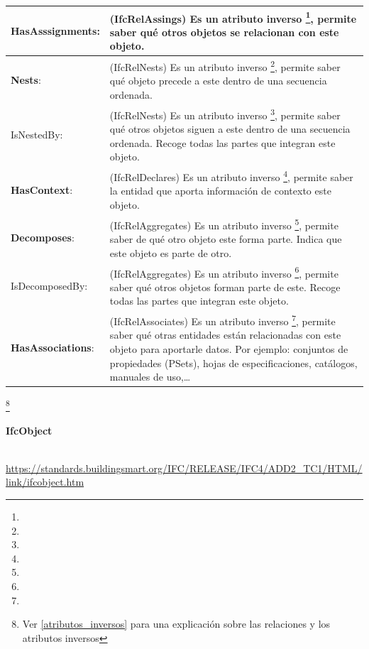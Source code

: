 \documentclass[spanish,12pt,a4paper,final,oneside]{book}
\begin{document}
\begin{longtable}{|p{2.5cm} p{11cm}|}
\hline

\textbf{HasAsssignments}: & (IfcRelAssings) Es un atributo inverso \footnote{}, permite saber qué otros objetos se relacionan con este objeto.
\\[0.1cm] \hline

\textbf{Nests}: & (IfcRelNests) Es un atributo inverso \footnote{}, permite saber qué objeto precede a este dentro de una secuencia ordenada.
\\[0.1cm] \hline

IsNestedBy: & (IfcRelNests) Es un atributo inverso \footnote{}, permite saber qué otros objetos siguen a este dentro de una secuencia ordenada. Recoge todas las partes que integran este objeto.
\\[0.1cm] \hline

\textbf{HasContext}: & (IfcRelDeclares) Es un atributo inverso \footnote{}, permite saber la entidad que aporta información de contexto este objeto.
\\[0.1cm] \hline

\textbf{Decomposes}: & (IfcRelAggregates) Es un atributo inverso \footnote{}, permite saber de qué otro objeto este forma parte. Indica que este objeto es parte de otro.
\\[0.1cm] \hline

IsDecomposedBy: & (IfcRelAggregates) Es un atributo inverso \footnote{}, permite saber qué otros objetos forman parte de este. Recoge todas las partes que integran este objeto.
\\[0.1cm] \hline

\textbf{HasAssociations}: & (IfcRelAssociates) Es un atributo inverso \footnote{}, permite saber qué otras entidades están relacionadas con este objeto para aportarle datos. Por ejemplo: conjuntos de propiedades (PSets), hojas de especificaciones, catálogos, manuales de uso,\ldots
\\[0.1cm] \hline

\end{longtable}
\footnote{Ver \ref{atributos_inversos} para una explicación sobre las relaciones y los atributos inversos}



\vspace{0.5cm}

\begin{large}\textbf{IfcObject}\end{large}
\\ \url{https://standards.buildingsmart.org/IFC/RELEASE/IFC4/ADD2_TC1/HTML/link/ifcobject.htm}
\end{document}
